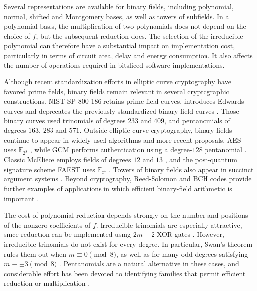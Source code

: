 \documentclass{ieeeaccess}
\theoremstyle{plain}
\theoremstyle{definition}
\newcommand{\F}{\mathbb{F}}
\begin{document}
Several representations are available for binary fields, including polynomial,
normal, shifted and Montgomery bases, as well as towers of subfields. In a
polynomial basis, the multiplication of two polynomials does not depend on the
choice of $f$, but the subsequent reduction does. The selection of the
irreducible polynomial can therefore have a substantial impact on implementation
cost, particularly in terms of circuit area, delay and energy consumption. It
also affects the number of operations required in bitsliced software
implementations.

Although recent standardization efforts in elliptic curve cryptography have
favored prime fields, binary fields remain relevant in several cryptographic
constructions. NIST SP 800-186 retains prime-field curves, introduces Edwards
curves and deprecates the previously standardized binary-field curves
\cite{SP800186,FIPS1865}. Those binary curves used trinomials of degrees $233$
and $409$, and pentanomials of degrees $163$, $283$ and $571$. Outside elliptic
curve cryptography, binary fields continue to appear in widely used algorithms
and more recent proposals. AES uses $\F_{2^8}$ \cite{FIPS197}, while GCM
performs authentication using a degree-$128$ pentanomial
\cite{SP80038D,GueronKounavis2010}. Classic McEliece employs fields of degrees
$12$ and $13$ \cite{ClassicMcEliece2022,McBits2013}, and the post-quantum
signature scheme FAEST uses $\F_{2^\lambda}$ \cite{FAEST2023}. Towers of binary
fields also appear in succinct argument systems \cite{DiamondPosen2025}. Beyond
cryptography, Reed-Solomon and BCH codes provide further examples of
applications in which efficient binary-field arithmetic is important
\cite{Paar1997}.

The cost of polynomial reduction depends strongly on the number and positions of
the nonzero coefficients of $f$. Irreducible trinomials are especially
attractive, since reduction can be implemented using $2m-2$ XOR gates
\cite{SunarKoc1999,Wu2002}. However, irreducible trinomials do not exist for
every degree. In particular, Swan's theorem rules them out when $m\equiv0\pmod
8$, as well as for many odd degrees satisfying $m\equiv\pm3\pmod 8$
\cite{Swan1962}. Pentanomials are a natural alternative in these cases, and
considerable effort has been devoted to identifying families that permit
efficient reduction or multiplication
\cite{HasanWangBhargava1992,RodriguezKoc2003,
ReyhaniHasan2004,Cilardo2013,Imana2018,BCP2019}.
\end{document}
